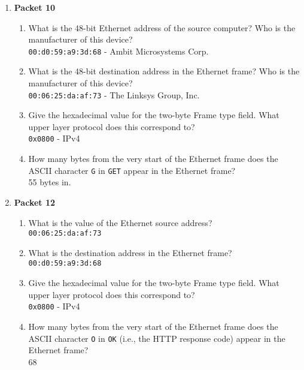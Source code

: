 \documentclass[12pt]{article}
\begin{document}
\begin{enumerate}[label=Q\arabic*:]
      \item \textbf{Packet 10}
            \begin{enumerate}[label=(\alph*)]
                  \item What is the 48-bit Ethernet address of the source computer? Who is the manufacturer of this device? \\
                        \texttt{00:d0:59:a9:3d:68} - Ambit Microsystems Corp.
                  \item What is the 48-bit destination address in the Ethernet frame? Who is the manufacturer of this device? \\
                        \texttt{00:06:25:da:af:73} - The Linksys Group, Inc.
                  \item Give the hexadecimal value for the two-byte Frame type field. What upper layer protocol does this correspond to? \\
                        \texttt{0x0800} - IPv4
                  \item How many bytes from the very start of the Ethernet frame does the ASCII character \texttt{G} in \texttt{GET} appear in the Ethernet frame? \\
                        55 bytes in.
            \end{enumerate}

      \item \textbf{Packet 12}
            \begin{enumerate}[label=(\alph*)]
                  \item What is the value of the Ethernet source address? \\
                        \texttt{00:06:25:da:af:73}
                  \item What is the destination address in the Ethernet frame? \\
                        \texttt{00:d0:59:a9:3d:68}
                  \item Give the hexadecimal value for the two-byte Frame type field. What upper layer protocol does this correspond to? \\
                        \texttt{0x0800} - IPv4
                  \item How many bytes from the very start of the Ethernet frame does the ASCII character \texttt{O} in \texttt{OK} (i.e., the HTTP response code) appear in the Ethernet frame? \\
                        68
            \end{enumerate}


\end{enumerate}
\end{document}
